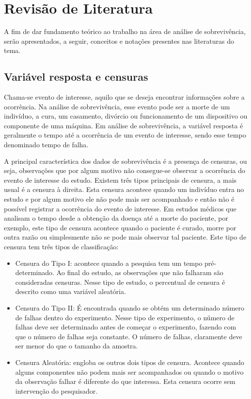 \documentclass[a4paper,12pt]{article}
\begin{document}
\section{Revisão de Literatura}

A fim de dar fundamento teórico ao trabalho na área de análise de sobrevivência, serão apresentados, a seguir, conceitos e notações presentes nas literaturas do tema.

\subsection{Variável resposta e censuras}
Chama-se evento de interesse, aquilo que se deseja encontrar informações sobre a ocorrência. Na análise de sobrevivência, esse evento pode ser a morte de um indivíduo, a cura, um casamento, divórcio ou funcionamento de um dispositivo ou componente de uma máquina. Em análise de sobrevivência, a variável resposta é geralmente o tempo até a ocorrência de um evento de interesse, sendo esse tempo denominado tempo de falha.%

A principal característica dos dados de sobrevivência é a presença de censuras, ou seja, observações que por algum motivo não consegue-se observar a ocorrência do evento de interesse do estudo. Existem três tipos principais de censura, a mais usual é a censura à direita. Esta censura acontece quando um indivíduo entra no estudo e por algum motivo ele não pode mais ser acompanhado e então não é possível registrar a ocorrência do evento de interesse. Em estudos médicos que analisam o tempo desde a obtenção da doença até a morte do paciente, por exemplo, este tipo de censura acontece quando o paciente é curado, morre por outra razão ou simplesmente não se pode mais observar tal paciente. Este tipo de censura tem três tipos de classificação:

\begin{itemize}
	\item Censura do Tipo I: acontece quando a pesquisa tem um tempo pré-determinado. Ao final do estudo, as observações que não falharam são consideradas censuras. Nesse tipo de estudo, o percentual de censura é descrito como uma variável aleatória.
	
	\item Censura do Tipo II: É encontrada quando se obtém um determinado número de falhas dentro do experimento. Nesse tipo de experimento, o número de falhas deve ser determinado antes de começar o experimento, fazendo com que o número de falhas seja constante. O número de falhas, claramente deve ser menor do que o tamanho da amostra.
	
	\item Censura Aleatória: engloba os outros dois tipos de censura. Acontece quando alguns componentes não podem mais ser acompanhados ou quando o motivo da observação falhar é diferente do que interessa. Esta censura ocorre sem intervenção do pesquisador.

\end{itemize}
\end{document}
